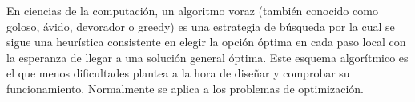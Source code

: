 En ciencias de la computación, un algoritmo voraz (también conocido como goloso, ávido, devorador o greedy) es una estrategia de búsqueda por la cual se sigue una heurística consistente en elegir la opción óptima en cada paso local con la esperanza de llegar a una solución general óptima. Este esquema algorítmico es el que menos dificultades plantea a la hora de diseñar y comprobar su funcionamiento. Normalmente se aplica a los problemas de optimización.